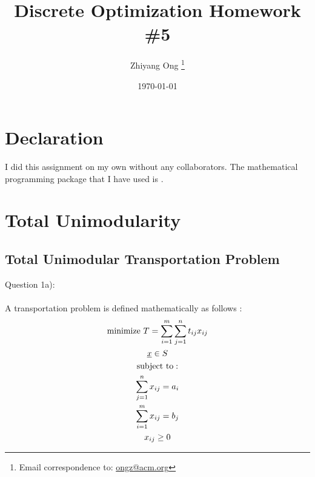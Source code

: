 \documentclass[letter,12pt]{article}
\begin{document}
\title{Discrete Optimization Homework \#5}
\date{\today}
\author{Zhiyang Ong
	\thanks{Email correspondence to: \href{mailto:ongz@acm.org}{ongz@acm.org}}
}
\maketitle






\section*{Declaration}
\label{sec:declaration}

I did this assignment on my own without any collaborators. The mathematical programming package that I have used is \cite{Makhorin2012}. 







\section{Total Unimodularity}
\label{sec:totalunimodularity}

\subsection{Total Unimodular Transportation Problem}
\label{ssec:totalunimodularitytransportationproblem}

Question 1a):\\
\ \\
A transportation problem is defined mathematically as follows \cite[\S8.4, pp.439--447]{Miller2000}:
\begin{eqnarray}
\label{eqn:transportationproblem}
	\begin{gathered}[b]
	{\rm minimize}\ T = \displaystyle\sum^{m}_{i = 1} \displaystyle\sum^{n}_{j = 1} t_{ij}x_{ij} \\
	\underline{x} \in S \\
	{\rm subject\ to:} \\
	\displaystyle\sum^{n}_{j = 1} x_{ij} = a_{i} \\
	\displaystyle\sum^{m}_{i = 1} x_{ij} = b_{j} \\
	x_{ij} \geq 0
	\end{gathered}
\end{eqnarray}
\end{document}
